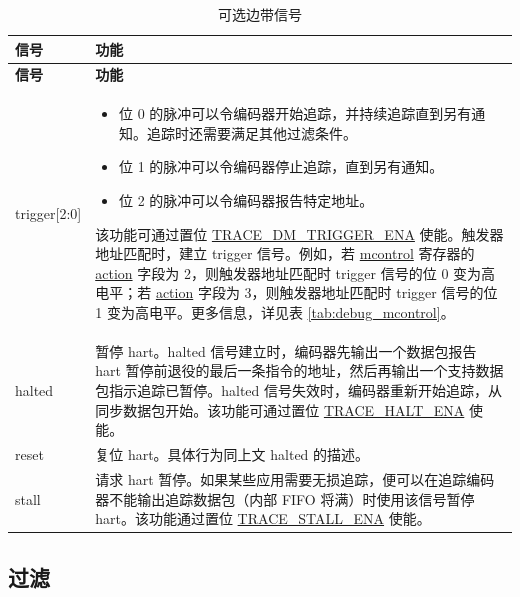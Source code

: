 \documentclass[main\_\_CN.tex]{subfiles}
\begin{document}
\begin{longtable}[c]{ |l|L{12cm}| }
    \caption{可选边带信号}
    \label{tab:sideband_signal}
    \\\hline{}
    \textbf{信号} & \textbf{功能}  \\\hline
    \endfirsthead
     \textbf{信号} & \textbf{功能}  \\\hline
    \endhead
    \endfoot
    \endlastfoot

    trigger[2:0] &
        \begin{itemize}
            \item 位 0 的脉冲可以令编码器开始追踪，并持续追踪直到另有通知。追踪时还需要满足其他过滤条件。
            \item 位 1 的脉冲可以令编码器停止追踪，直到另有通知。
            \item 位 2 的脉冲可以令编码器报告特定地址。
        \end{itemize}
        该功能可通过置位 \hyperref[fielddesc:TRACEDMTRIGGERENA]{TRACE\_DM\_TRIGGER\_ENA} 使能。触发器地址匹配时，建立 trigger 信号。例如，若 \hyperref[regdesc:MCONTROL]{mcontrol} 寄存器的 \hyperref[fielddesc:MCONTROLACTION]{action} 字段为 2，则触发器地址匹配时 trigger 信号的位 0 变为高电平；若 \hyperref[fielddesc:MCONTROLACTION]{action} 字段为 3，则触发器地址匹配时 trigger 信号的位 1 变为高电平。更多信息，详见表 \ref{tab:debug_mcontrol}。\\\hline

    halted & 暂停 hart。halted 信号建立时，编码器先输出一个数据包报告 hart 暂停前退役的最后一条指令的地址，然后再输出一个支持数据包指示追踪已暂停。halted 信号失效时，编码器重新开始追踪，从同步数据包开始。该功能可通过置位 \hyperref[fielddesc:TRACEHALTENA]{TRACE\_HALT\_ENA} 使能。 \\\hline

    reset & 复位 hart。具体行为同上文 halted 的描述。 \\\hline

    stall & 请求 hart 暂停。如果某些应用需要无损追踪，便可以在追踪编码器不能输出追踪数据包（内部 FIFO 将满）时使用该信号暂停 hart。该功能通过置位 \hyperref[fielddesc:TRACESTALLENA]{TRACE\_STALL\_ENA} 使能。\\\hline

\end{longtable}



\subsection{过滤}\label{sec:riscvtracenc-filter}
\end{document}
